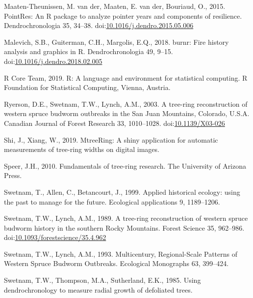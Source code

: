 \documentclass[review]{elsarticle} %
\begin{document}
\leavevmode\hypertarget{ref-VanderMaaten-Theunissen2015}{}%
Maaten-Theunissen, M. van der, Maaten, E. van der, Bouriaud, O., 2015. PointRes: An R package to analyze pointer years and components of resilience. Dendrochronologia 35, 34--38. doi:\href{https://doi.org/10.1016/j.dendro.2015.05.006}{10.1016/j.dendro.2015.05.006}

\leavevmode\hypertarget{ref-Malevich2018}{}%
Malevich, S.B., Guiterman, C.H., Margolis, E.Q., 2018. burnr: Fire history analysis and graphics in R. Dendrochronologia 49, 9--15. doi:\href{https://doi.org/10.1016/j.dendro.2018.02.005}{10.1016/j.dendro.2018.02.005}

\leavevmode\hypertarget{ref-RCore}{}%
R Core Team, 2019. R: A language and environment for statistical computing. R Foundation for Statistical Computing, Vienna, Austria.

\leavevmode\hypertarget{ref-Ryerson2003}{}%
Ryerson, D.E., Swetnam, T.W., Lynch, A.M., 2003. A tree-ring reconstruction of western spruce budworm outbreaks in the San Juan Mountains, Colorado, U.S.A. Canadian Journal of Forest Research 33, 1010--1028. doi:\href{https://doi.org/10.1139/X03-026}{10.1139/X03-026}

\leavevmode\hypertarget{ref-Shi2019}{}%
Shi, J., Xiang, W., 2019. MtreeRing: A shiny application for automatic measurements of tree-ring widths on digital images.

\leavevmode\hypertarget{ref-Speer2010}{}%
Speer, J.H., 2010. Fundamentals of tree-ring research. The University of Arizona Press.

\leavevmode\hypertarget{ref-Swetnam1999}{}%
Swetnam, T., Allen, C., Betancourt, J., 1999. Applied historical ecology: using the past to manage for the future. Ecological applications 9, 1189--1206.

\leavevmode\hypertarget{ref-Swetnam1989}{}%
Swetnam, T.W., Lynch, A.M., 1989. A tree-ring reconstruction of western spruce budworm history in the southern Rocky Mountains. Forest Science 35, 962--986. doi:\href{https://doi.org/10.1093/forestscience/35.4.962}{10.1093/forestscience/35.4.962}

\leavevmode\hypertarget{ref-Swetnam1993}{}%
Swetnam, T.W., Lynch, A.M., 1993. Multicentury, Regional-Scale Patterns of Western Spruce Budworm Outbreaks. Ecological Monographs 63, 399--424.

\leavevmode\hypertarget{ref-Swetnam1985}{}%
Swetnam, T.W., Thompson, M.A., Sutherland, E.K., 1985. Using dendrochronology to measure radial growth of defoliated trees.
\end{document}

